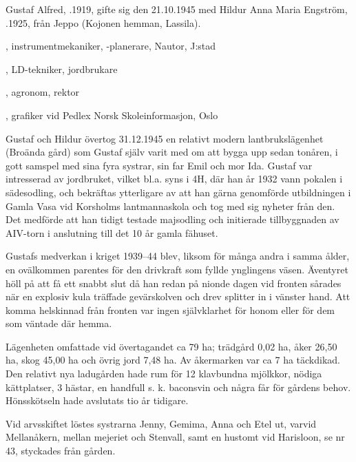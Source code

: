 %
Gustaf Alfred, .1919, gifte sig den 21.10.1945 med Hildur Anna Maria Engström, .1925, från Jeppo (Kojonen hemman, Lassila).
\begin{jhchildren}
  \item {}, instrumentmekaniker, -planerare, Nautor, J:stad
  \item {}, LD-tekniker, jordbrukare
  \item {}, agronom, rektor
  \item {}, grafiker vid Pedlex Norsk Skoleinformasjon, Oslo
\end{jhchildren}
Gustaf och Hildur övertog 31.12.1945 en relativt modern lantbrukslägenhet (Broända gård) som Gustaf själv varit med om att bygga upp sedan tonåren, i gott samspel med sina fyra systrar, sin far Emil och mor Ida. Gustaf var intresserad av jordbruket, vilket bl.a. syns i 4H, där han år 1932 vann pokalen i sädesodling, och bekräftas ytterligare av att han gärna genomförde utbildningen i Gamla Vasa vid Korsholms lantmannaskola och tog med sig nyheter från den. Det medförde att han tidigt testade majsodling och initierade tillbyggnaden av AIV-torn i anslutning till det 10 år gamla fähuset.

Gustafs medverkan i kriget 1939--44 blev, liksom för många andra i samma ålder, en ovälkommen parentes för den drivkraft som fyllde ynglingens väsen. Äventyret höll på att få ett snabbt slut då han redan på nionde dagen vid fronten sårades när en explosiv kula träffade gevärskolven och drev splitter in i vänster hand. Att komma helskinnad från fronten var ingen självklarhet för honom eller för dem som väntade där hemma.

Lägenheten omfattade vid övertagandet ca 79 ha; trädgård 0,02 ha, åker 26,50 ha, skog 45,00 ha och övrig jord 7,48 ha. Av åkermarken var ca 7 ha täckdikad. Den relativt nya ladugården hade rum för 12 klavbundna mjölkkor, nödiga kättplatser, 3 hästar, en handfull s. k. baconsvin och några får för gårdens behov. Hönsskötseln hade avslutats tio år tidigare.

Vid arvsskiftet löstes systrarna Jenny, Gemima, Anna och Etel ut, varvid Mellanåkern, mellan mejeriet och Stenvall, samt en hustomt vid Harisloon, se nr 43, styckades från gården.

